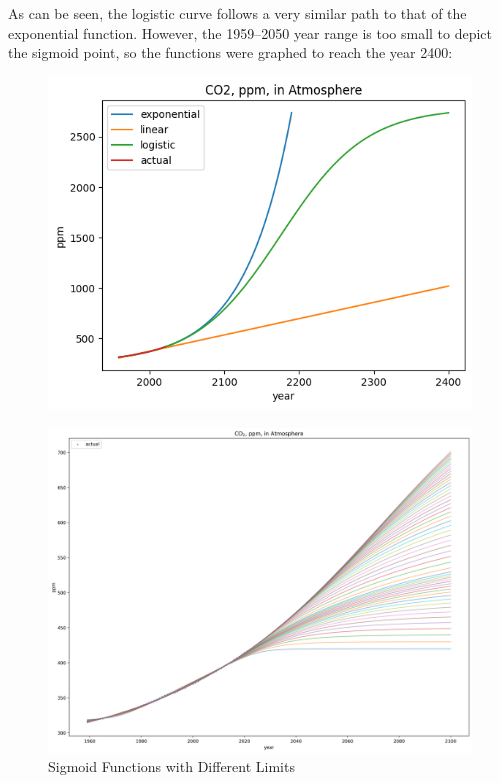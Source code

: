 \documentclass[12pt]{mcmthesis}
\begin{document}
    As can be seen, the logistic curve follows a very similar path to that of the exponential function. However, the 1959--2050 year range is too small to depict the sigmoid point, so the functions were graphed to reach the year 2400:

    \begin{figure}[h]
        \begin{minipage}{0.5\linewidth}
            \centering
            \includegraphics[width=\textwidth]{logistic_2400}%
            \label{fig:co2_logi_2400}
        \end{minipage}%
        \begin{minipage}{0.5\linewidth}
            \centering
            \includegraphics[width=\textwidth]{co2_sigm_all}%
            \caption{Sigmoid Functions with Different Limits}
            \label{fig:co2_sigm_all}
        \end{minipage}
    \end{figure}
\end{document}
